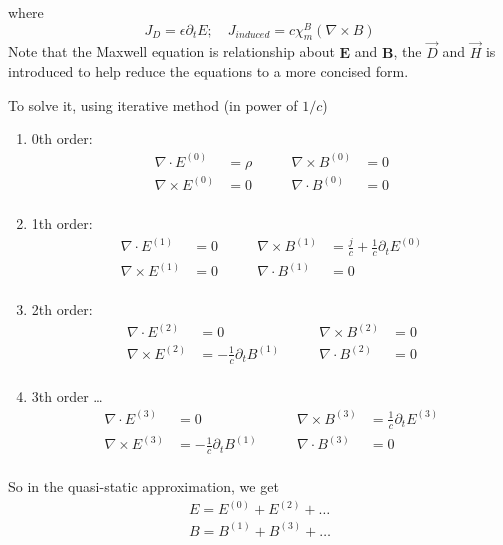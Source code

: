 where 
\[J_D = \epsilon\partial_{t}E; \quad J_{induced} = c\chi_m^B(\nabla\times{B})\]
Note that the Maxwell equation is relationship about $\mathbf{E}$ and
$\mathbf{B}$, the $\vec{D}$ and $\vec{H}$ is introduced to help reduce the
equations to a more concised form. 

To solve it, using iterative method (in power of $1/c$)
\begin{enumerate}[label=\roman*)]
\item 0th order:
\[
    \begin{aligned}
	\nabla\cdot{E^{(0)}} &= \rho	\qquad	&\nabla\times{B^{(0)}} &= 0 \\
	\nabla\times{E^{(0)}} &= 0	\qquad	&\nabla\cdot{B^{(0)}}  &= 0 \\
    \end{aligned}
\]
\item 1th order:
\[
    \begin{aligned}
	\nabla\cdot{E^{(1)}} &= 0	\qquad	&\nabla\times{B^{(1)}} &= \frac{j}{c} + \frac{1}{c}\partial_{t}E^{(0)}	\\
	\nabla\times{E^{(1)}} &= 0	\qquad	&\nabla\cdot{B^{(1)}}  &= 0 \\
    \end{aligned}
\]
\item 2th order:
\[
    \begin{aligned}
	\nabla\cdot{E^{(2)}} &= 0	\qquad	&\nabla\times{B^{(2)}} &= 0 \\
	\nabla\times{E^{(2)}} &= -\frac{1}{c}\partial_{t}B^{(1)}
	\qquad	&\nabla\cdot{B^{(2)}}  &= 0 \\
    \end{aligned}
\]
\item 3th order \dots
\[
    \begin{aligned}
	\nabla\cdot{E^{(3)}} &= 0	\qquad	&\nabla\times{B^{(3)}} &= \frac{1}{c}\partial_{t}E^{(3)} \\
	\nabla\times{E^{(3)}} &= -\frac{1}{c}\partial_{t}B^{(1)}
	\qquad	&\nabla\cdot{B^{(3)}}  &= 0 \\
    \end{aligned}
\]
\end{enumerate}
So in the quasi-static approximation, we get 
\[
    \begin{aligned}
    E = E^{(0)} + E^{(2)} + \dots   \\
    B = B^{(1)} + B^{(3)} + \dots   \\
    \end{aligned}
    \]

